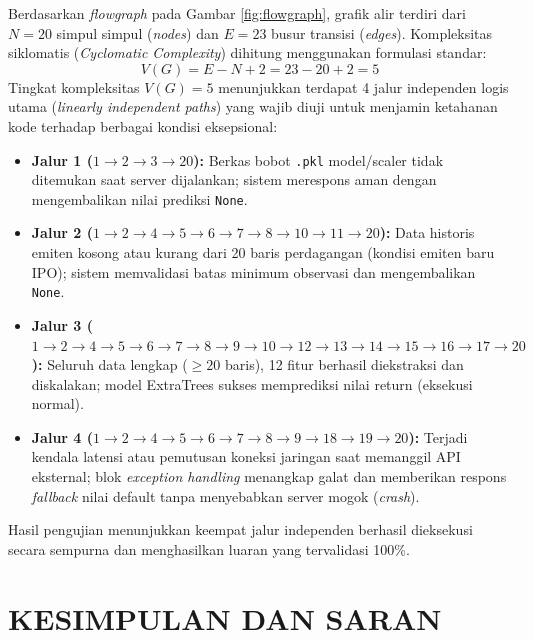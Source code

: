 \documentclass[10pt,a4paper]{article}
\begin{document}
Berdasarkan \textit{flowgraph} pada Gambar \ref{fig:flowgraph}, grafik alir terdiri dari $N = 20$ simpul simpul (\textit{nodes}) dan $E = 23$ busur transisi (\textit{edges}). Kompleksitas siklomatis (\textit{Cyclomatic Complexity}) dihitung menggunakan formulasi standar:
\begin{equation}
  V(G) = E - N + 2 = 23 - 20 + 2 = 5
  \label{eq:cyclomatic}
\end{equation}
Tingkat kompleksitas $V(G) = 5$ menunjukkan terdapat 4 jalur independen logis utama (\textit{linearly independent paths}) yang wajib diuji untuk menjamin ketahanan kode terhadap berbagai kondisi eksepsional:
\begin{itemize}
  \item \textbf{Jalur 1 ($1 \to 2 \to 3 \to 20$):} Berkas bobot \texttt{.pkl} model/scaler tidak ditemukan saat server dijalankan; sistem merespons aman dengan mengembalikan nilai prediksi \texttt{None}.
  \item \textbf{Jalur 2 ($1 \to 2 \to 4 \to 5 \to 6 \to 7 \to 8 \to 10 \to 11 \to 20$):} Data historis emiten kosong atau kurang dari 20 baris perdagangan (kondisi emiten baru IPO); sistem memvalidasi batas minimum observasi dan mengembalikan \texttt{None}.
  \item \textbf{Jalur 3 ($1 \to 2 \to 4 \to 5 \to 6 \to 7 \to 8 \to 9 \to 10 \to 12 \to 13 \to 14 \to 15 \to 16 \to 17 \to 20$):} Seluruh data lengkap ($\ge 20$ baris), 12 fitur berhasil diekstraksi dan diskalakan; model ExtraTrees sukses memprediksi nilai return (eksekusi normal).
  \item \textbf{Jalur 4 ($1 \to 2 \to 4 \to 5 \to 6 \to 7 \to 8 \to 9 \to 18 \to 19 \to 20$):} Terjadi kendala latensi atau pemutusan koneksi jaringan saat memanggil API eksternal; blok \textit{exception handling} menangkap galat dan memberikan respons \textit{fallback} nilai default tanpa menyebabkan server mogok (\textit{crash}).
\end{itemize}
Hasil pengujian menunjukkan keempat jalur independen berhasil dieksekusi secara sempurna dan menghasilkan luaran yang tervalidasi 100\%.

\FloatBarrier
\section{KESIMPULAN DAN SARAN}
\end{document}
